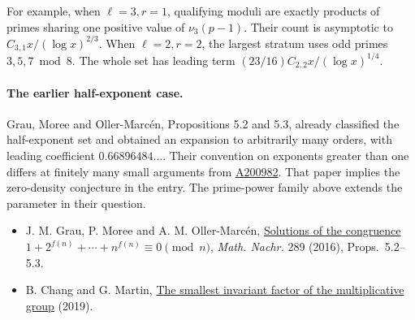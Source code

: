 \documentclass[11pt,letterpaper]{article}
\newcommand{\oeis}[1]{\href{https://oeis.org/A#1}{A#1}}
\begin{document}
For example, when \(\ell=3,r=1\), qualifying moduli are exactly products of primes sharing one positive value of \(\nu_3(p-1)\). Their count is asymptotic to \(C_{3,1}x/(\log x)^{2/3}\). When \(\ell=2,r=2\), the largest stratum uses odd primes \(3,5,7\bmod 8\). The whole set has leading term \((23/16)C_{2,2}x/(\log x)^{1/4}\).

\paragraph{The earlier half-exponent case.}
Grau, Moree and Oller-Marcén, Propositions 5.2 and 5.3, already classified the half-exponent set and obtained an expansion to arbitrarily many orders, with leading coefficient \(0.66896484\ldots\). Their convention on exponents greater than one differs at finitely many small arguments from \oeis{200982}. That paper implies the zero-density conjecture in the entry. The prime-power family above extends the parameter in their question.

\begin{itemize}
\item J. M. Grau, P. Moree and A. M. Oller-Marcén, \href{https://www.unioviedo.es/grau/ARTICULOS%20PUBLICADOS/articulo52.pdf}{Solutions of the congruence \(1+2^{f(n)}+\cdots+n^{f(n)}\equiv0\pmod n\)}, \emph{Math. Nachr.} 289 (2016), Props.~5.2--5.3.
\item B. Chang and G. Martin, \href{https://arxiv.org/abs/1908.00035}{The smallest invariant factor of the multiplicative group} (2019).
\end{itemize}
\end{document}

